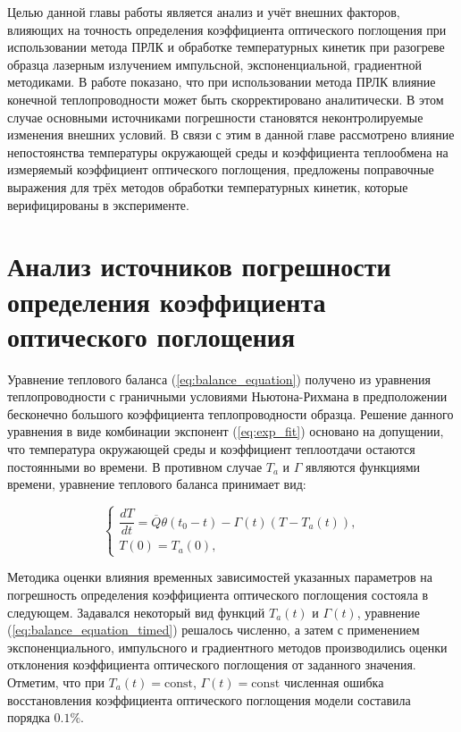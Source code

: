Целью данной главы работы является анализ и учёт внешних факторов, влияющих на точность определения коэффициента оптического поглощения при использовании метода ПРЛК и обработке температурных кинетик при разогреве образца лазерным излучением импульсной, экспоненциальной, градиентной методиками. В работе \cite{zotov2025} показано, что при использовании метода ПРЛК влияние конечной теплопроводности может быть скорректировано аналитически. В этом случае основными источниками погрешности становятся неконтролируемые изменения внешних условий. В связи с этим в данной главе рассмотрено влияние непостоянства температуры окружающей среды и коэффициента теплообмена на измеряемый коэффициент оптического поглощения, предложены поправочные выражения для трёх методов обработки температурных кинетик, которые верифицированы в эксперименте.


\section{Анализ источников погрешности определения коэффициента оптического поглощения}

Уравнение теплового баланса (\ref{eq:balance_equation}) получено из уравнения теплопроводности с граничными условиями Ньютона-Рихмана в предположении бесконечно большого коэффициента теплопроводности образца. Решение данного уравнения в виде комбинации экспонент (\ref{eq:exp_fit}) основано на допущении, что температура окружающей среды и коэффициент теплоотдачи остаются постоянными во времени. В противном случае $T_a$ и $\Gamma$ являются функциями времени, уравнение теплового баланса принимает вид:

\begin{equation}
	\begin{cases}
		\dfrac{d T}{d t} = \overline{Q}\theta(t_0 - t) - \Gamma(t)(T - T_a(t)), \\
		T(0) = T_a(0),
	\end{cases}
	\label{eq:balance_equation_timed}
\end{equation}

Методика оценки влияния временных зависимостей указанных параметров на погрешность определения коэффициента оптического поглощения состояла в следующем. Задавался некоторый вид функций $T_a(t)$ и $\Gamma(t)$, уравнение (\ref{eq:balance_equation_timed}) решалось численно, а затем с применением экспоненциального, импульсного и градиентного методов производились оценки отклонения коэффициента оптического поглощения от заданного значения. Отметим, что при  $T_a(t) = \text{const}$, $\Gamma(t) = \text{const}$ численная ошибка восстановления коэффициента оптического поглощения модели составила порядка $0.1\%$.

